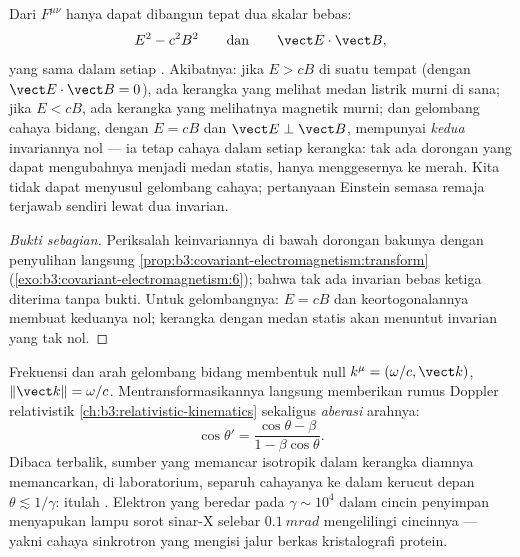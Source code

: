 \begin{proposition}\label{prop:b3:covariant-electromagnetism:invariants}
Dari $F^{\mu\nu}$ hanya dapat dibangun tepat dua skalar bebas:
\[
E^2 - c^2B^2
\qquad\text{dan}\qquad
\vect E\cdot\vect B ,
\]
yang sama dalam setiap . Akibatnya: jika $E > cB$ di
suatu tempat (dengan $\vect E\cdot\vect B = 0$), ada kerangka yang
melihat medan listrik murni di sana; jika $E < cB$, ada kerangka yang
melihatnya magnetik murni; dan gelombang cahaya bidang, dengan $E = cB$
dan $\vect E\perp\vect B$, mempunyai \emph{kedua} invariannya nol ---
ia tetap cahaya dalam setiap kerangka: tak ada dorongan yang dapat
mengubahnya menjadi medan statis, hanya menggesernya ke merah. Kita
tidak dapat menyusul gelombang cahaya; pertanyaan Einstein semasa remaja
terjawab sendiri lewat dua invarian.
\end{proposition}

\begin{proof}[Bukti sebagian]
Periksalah keinvariannya di bawah dorongan bakunya dengan penyulihan
langsung
\cref{prop:b3:covariant-electromagnetism:transform}
(\cref{exo:b3:covariant-electromagnetism:6}); bahwa tak ada invarian
bebas ketiga diterima tanpa bukti. Untuk gelombangnya: $E = cB$ dan
keortogonalannya membuat keduanya nol; kerangka dengan medan statis
akan menuntut invarian yang tak nol.
\end{proof}

\begin{proposition}\label{prop:b3:covariant-electromagnetism:wavevector}
Frekuensi dan arah gelombang bidang membentuk  null
$k^\mu = (\omega/c, \vect k)$, $\|\vect k\| = \omega/c$.
Mentransformasikannya langsung memberikan rumus Doppler relativistik
\cref{ch:b3:relativistic-kinematics} sekaligus \emph{aberasi}
arahnya:
\[
\cos\theta' = \frac{\cos\theta - \beta}{1 - \beta\cos\theta} .
\]
Dibaca terbalik, sumber yang memancar isotropik dalam kerangka diamnya
memancarkan, di laboratorium, separuh cahayanya ke dalam kerucut depan $\theta
\lesssim 1/\gamma$: itulah \emph{}. Elektron
yang beredar pada $\gamma \sim 10^4$ dalam cincin penyimpan menyapukan
lampu sorot sinar-X selebar $\qty{0.1}{mrad}$ mengelilingi cincinnya ---
yakni cahaya sinkrotron yang mengisi jalur berkas kristalografi protein.
\end{proposition}

